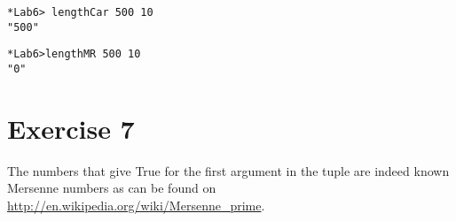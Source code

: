 \documentclass{article}
\begin{document}

\begin{verbatim}
*Lab6> lengthCar 500 10
"500"
\end{verbatim}

\begin{verbatim}
*Lab6>lengthMR 500 10
"0"
\end{verbatim}

\section*{Exercise 7}


The numbers that give True for the first argument in the tuple are indeed known Mersenne numbers as can be found on \url{http://en.wikipedia.org/wiki/Mersenne_prime}.
\end{document}
